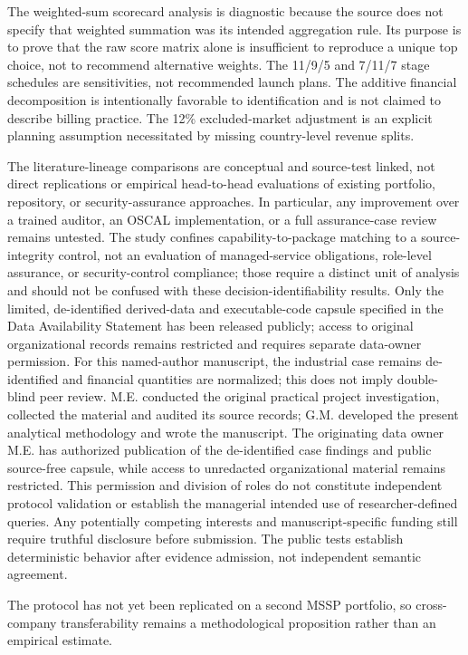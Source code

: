\documentclass[systems,article,submit,moreauthors]{Definitions/mdpi}
\begin{document}
The weighted-sum scorecard analysis is diagnostic because the source does not specify that weighted summation was its intended aggregation rule. Its purpose is to prove that the raw score matrix alone is insufficient to reproduce a unique top choice, not to recommend alternative weights. The 11/9/5 and 7/11/7 stage schedules are sensitivities, not recommended launch plans. The additive financial decomposition is intentionally favorable to identification and is not claimed to describe billing practice. The 12\% excluded-market adjustment is an explicit planning assumption necessitated by missing country-level revenue splits.

The literature-lineage comparisons are conceptual and source-test linked, not direct replications or empirical head-to-head evaluations of existing portfolio, repository, or security-assurance approaches. In particular, any improvement over a trained auditor, an OSCAL implementation, or a full assurance-case review remains untested. The study confines capability-to-package matching to a source-integrity control, not an evaluation of managed-service obligations, role-level assurance, or security-control compliance; those require a distinct unit of analysis and should not be confused with these decision-identifiability results. Only the limited, de-identified derived-data and executable-code capsule specified in the Data Availability Statement has been released publicly; access to original organizational records remains restricted and requires separate data-owner permission. For this named-author manuscript, the industrial case remains de-identified and financial quantities are normalized; this does not imply double-blind peer review. M.E. conducted the original practical project investigation, collected the material and audited its source records; G.M. developed the present analytical methodology and wrote the manuscript. The originating data owner M.E. has authorized publication of the de-identified case findings and public source-free capsule, while access to unredacted organizational material remains restricted. This permission and division of roles do not constitute independent protocol validation or establish the managerial intended use of researcher-defined queries. Any potentially competing interests and manuscript-specific funding still require truthful disclosure before submission. The public tests establish deterministic behavior after evidence admission, not independent semantic agreement. 

The protocol has not yet been replicated on a second MSSP portfolio, so cross-company transferability remains a methodological proposition rather than an empirical estimate.
\end{document}
